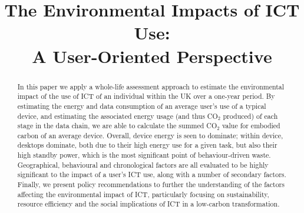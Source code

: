 \documentclass[conference]{IEEEtran}
\begin{document}

\title{The Environmental Impacts of ICT Use:\\A User-Oriented Perspective}


\author{
}





\maketitle


\begin{abstract}
In this paper we apply a whole-life assessment approach to estimate the
environmental impact of the use of ICT of an individual within the UK
over a one-year period. By estimating the energy and data consumption
of an average user's use of a typical device, and estimating
the associated energy usage (and thus CO$_2$ produced) of each stage
in the data chain, we are able to calculate the summed CO$_2$ value
for embodied carbon of an average device. 
Overall, device energy is seen to dominate; within device, desktops
dominate, both due to their high energy use for a given task, but also
their high standby power, which is the most significant point of
behaviour-driven waste. Geographical, behavioural and chronological
factors are all evaluated to be highly significant to the impact of a
user's ICT use, along with a number of secondary factors. Finally, we
present policy recommendations to further the understanding of the
factors affecting the environmental impact of ICT, particularly
focusing on sustainability, resource efficiency and the social
implications of ICT in a low-carbon transformation.
\end{abstract}
\end{document}
